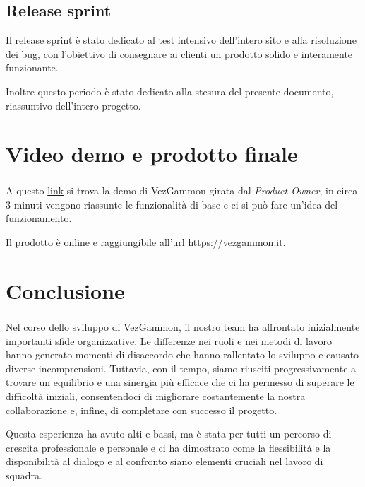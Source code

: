 \documentclass{article}
\begin{document}
\subsection{Release sprint}
Il release sprint è stato dedicato al test intensivo dell'intero sito e alla risoluzione dei bug, con l'obiettivo di consegnare ai clienti un 
prodotto solido e interamente funzionante.

Inoltre questo periodo è stato dedicato alla stesura del presente documento, riassuntivo dell'intero progetto.

\section{Video demo e prodotto finale}
A questo \href{https://www.youtube.com/watch?v=dQw4w9WgXcQ}{link} si trova la demo di VezGammon\textsuperscript{\texttrademark} girata dal \textit{Product Owner}, 
in circa 3 minuti vengono riassunte le funzionalità di base e ci si può fare un'idea del funzionamento.

Il prodotto è online e raggiungibile all'url \url{https://vezgammon.it}.

\section{Conclusione}
Nel corso dello sviluppo di VezGammon\textsuperscript{\texttrademark}, il nostro team ha affrontato inizialmente importanti sfide organizzative. 
Le differenze nei ruoli e nei metodi di lavoro hanno generato momenti di disaccordo che hanno rallentato lo sviluppo e causato diverse incomprensioni. Tuttavia, con il tempo, 
siamo riusciti progressivamente a trovare un equilibrio e una sinergia più efficace che ci ha permesso di superare le difficoltà iniziali, consentendoci di migliorare 
costantemente la nostra collaborazione e, infine, di completare con successo il progetto. 

Questa esperienza ha avuto alti e bassi, ma è stata per tutti un percorso di crescita professionale e personale e ci ha dimostrato come la flessibilità e la disponibilità 
al dialogo e al confronto siano elementi cruciali nel lavoro di squadra.
\end{document}
